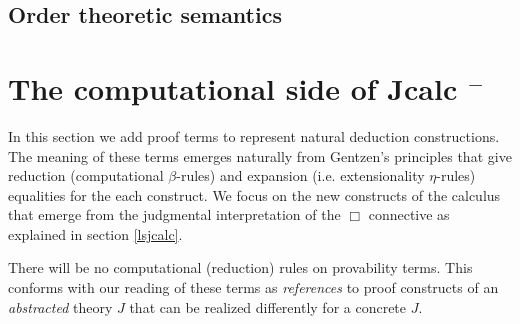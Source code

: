 			
			
			
			
			\section{Order theoretic semantics}

\chapter{The computational side of Jcalc $^{-}$}
			In this section we add proof terms to represent natural deduction constructions. The  meaning of these terms emerges naturally from Gentzen's principles that give reduction (computational $\beta$-rules) and expansion (i.e. extensionality $\eta$-rules) equalities for the each construct. We focus on the new constructs of the calculus that emerge from the judgmental interpretation of the $\Box$ connective as explained in 
			section \ref{lsjcalc}.
			
			There will be no computational (reduction) rules on  provability terms. 
			This conforms with our reading of these terms  as \textit{references} to proof constructs of an \textit{abstracted} theory $J$ that can be realized 
			differently for a concrete $J$.  
